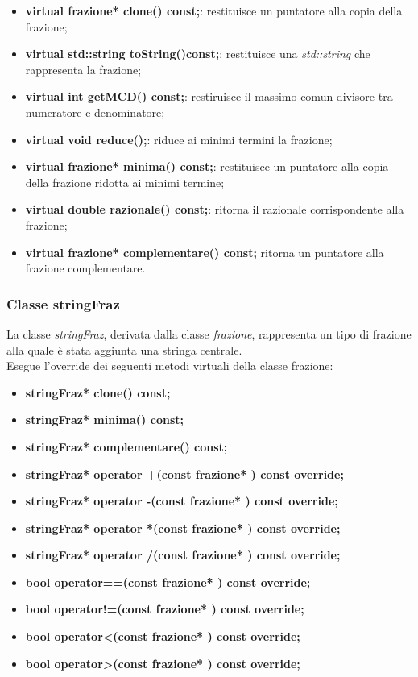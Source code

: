 \documentclass[a4paper,10pt]{article}
\begin{document}
        \begin{itemize}
            \item \textbf{virtual frazione* clone() const;}: restituisce un puntatore alla copia della frazione;
            \item \textbf{virtual std::string toString()const;}: restituisce una \textit{std::string} che rappresenta la frazione;
            \item \textbf{virtual int getMCD() const;}: restiruisce il massimo comun divisore tra numeratore e denominatore;
            \item \textbf{virtual void reduce();}: riduce ai minimi termini la frazione;
            \item \textbf{virtual frazione*  minima() const;}: restituisce un puntatore alla copia della frazione ridotta ai minimi termine;
            \item \textbf{virtual double razionale() const;}: ritorna il razionale corrispondente alla frazione;
            \item \textbf{virtual frazione*  complementare() const;} ritorna un puntatore alla frazione complementare.
        \end{itemize}
    \subsubsection{Classe stringFraz}
        La classe \textit{stringFraz}, derivata dalla classe \textit{frazione}, rappresenta un tipo di frazione alla quale è stata aggiunta una stringa centrale.
       \\ Esegue l'override dei seguenti metodi virtuali della classe frazione:
        \begin{itemize}
            \item \textbf{stringFraz* clone() const;}
            \item \textbf{stringFraz* minima() const;}
            \item \textbf{stringFraz* complementare() const;}
            \item \textbf{stringFraz* operator +(const frazione* ) const override;}
            \item \textbf{stringFraz* operator -(const frazione* ) const override;}
            \item \textbf{stringFraz* operator *(const frazione* ) const override;}
            \item \textbf{stringFraz* operator /(const frazione* ) const override;}
            \item \textbf{bool operator==(const frazione* ) const override;}
            \item \textbf{bool operator!=(const frazione* ) const override;}
            \item \textbf{bool operator<(const frazione* ) const override;}
            \item \textbf{bool operator>(const frazione* ) const override;}
        \end{itemize}
\end{document}
